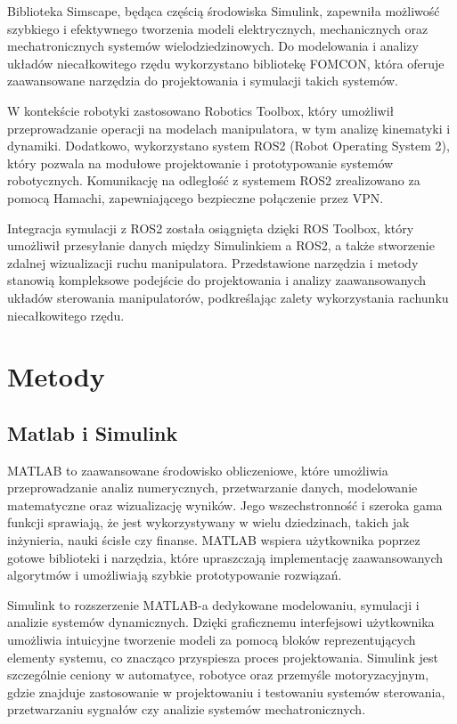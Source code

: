 \documentclass[journal,twoside,web]{ieeecolor}
\begin{document}
Biblioteka Simscape, będąca częścią środowiska Simulink, zapewniła możliwość szybkiego i efektywnego tworzenia modeli elektrycznych, mechanicznych oraz mechatronicznych systemów wielodziedzinowych. Do modelowania i analizy układów niecałkowitego rzędu wykorzystano bibliotekę FOMCON, która oferuje zaawansowane narzędzia do projektowania i symulacji takich systemów.

W kontekście robotyki zastosowano Robotics Toolbox, który umożliwił przeprowadzanie operacji na modelach manipulatora, w tym analizę kinematyki i dynamiki. Dodatkowo, wykorzystano system ROS2 (Robot Operating System 2), który pozwala na modułowe projektowanie i prototypowanie systemów robotycznych. Komunikację na odległość z systemem ROS2 zrealizowano za pomocą Hamachi, zapewniającego bezpieczne połączenie przez VPN.

Integracja symulacji z ROS2 została osiągnięta dzięki ROS Toolbox, który umożliwił przesyłanie danych między Simulinkiem a ROS2, a także stworzenie zdalnej wizualizacji ruchu manipulatora. Przedstawione narzędzia i metody stanowią kompleksowe podejście do projektowania i analizy zaawansowanych układów sterowania manipulatorów, podkreślając zalety wykorzystania rachunku niecałkowitego rzędu. 
\section{Metody}
\subsection{Matlab i Simulink}
MATLAB to zaawansowane środowisko obliczeniowe, które umożliwia przeprowadzanie analiz numerycznych, przetwarzanie danych, modelowanie matematyczne oraz wizualizację wyników. Jego wszechstronność i szeroka gama funkcji sprawiają, że jest wykorzystywany w wielu dziedzinach, takich jak inżynieria, nauki ścisłe czy finanse. MATLAB wspiera użytkownika poprzez gotowe biblioteki i narzędzia, które upraszczają implementację zaawansowanych algorytmów i umożliwiają szybkie prototypowanie rozwiązań. \href{https://www.mathworks.com/help/matlab/}{\cite{matlab}}

Simulink to rozszerzenie MATLAB-a dedykowane modelowaniu, symulacji i analizie systemów dynamicznych. Dzięki graficznemu interfejsowi użytkownika umożliwia intuicyjne tworzenie modeli za pomocą bloków reprezentujących elementy systemu, co znacząco przyspiesza proces projektowania. Simulink jest szczególnie ceniony w automatyce, robotyce oraz przemyśle motoryzacyjnym, gdzie znajduje zastosowanie w projektowaniu i testowaniu systemów sterowania, przetwarzaniu sygnałów czy analizie systemów mechatronicznych. \href{https://www.mathworks.com/help/simulink/}{\cite{simulink}}
\end{document}
